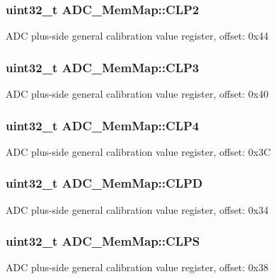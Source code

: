 \subsubsection[{C\+L\+P2}]{\setlength{\rightskip}{0pt plus 5cm}uint32\+\_\+t A\+D\+C\+\_\+\+Mem\+Map\+::\+C\+L\+P2}\label{struct_a_d_c___mem_map_aac028a79faac6929bebb1b677b2fbf8b}
A\+D\+C plus-\/side general calibration value register, offset\+: 0x44 \hypertarget{struct_a_d_c___mem_map_a6c77f6b67fa1eccf3549bcf27933f5e7}{}
\subsubsection[{C\+L\+P3}]{\setlength{\rightskip}{0pt plus 5cm}uint32\+\_\+t A\+D\+C\+\_\+\+Mem\+Map\+::\+C\+L\+P3}\label{struct_a_d_c___mem_map_a6c77f6b67fa1eccf3549bcf27933f5e7}
A\+D\+C plus-\/side general calibration value register, offset\+: 0x40 \hypertarget{struct_a_d_c___mem_map_ac5abb63ee92fd5bef99367385b258b20}{}
\subsubsection[{C\+L\+P4}]{\setlength{\rightskip}{0pt plus 5cm}uint32\+\_\+t A\+D\+C\+\_\+\+Mem\+Map\+::\+C\+L\+P4}\label{struct_a_d_c___mem_map_ac5abb63ee92fd5bef99367385b258b20}
A\+D\+C plus-\/side general calibration value register, offset\+: 0x3\+C \hypertarget{struct_a_d_c___mem_map_a33d6e852c48cf68ba5b7db5f96e284f8}{}
\subsubsection[{C\+L\+P\+D}]{\setlength{\rightskip}{0pt plus 5cm}uint32\+\_\+t A\+D\+C\+\_\+\+Mem\+Map\+::\+C\+L\+P\+D}\label{struct_a_d_c___mem_map_a33d6e852c48cf68ba5b7db5f96e284f8}
A\+D\+C plus-\/side general calibration value register, offset\+: 0x34 \hypertarget{struct_a_d_c___mem_map_a6c8a55400c2b32d7018d37b23a6f3ec1}{}
\subsubsection[{C\+L\+P\+S}]{\setlength{\rightskip}{0pt plus 5cm}uint32\+\_\+t A\+D\+C\+\_\+\+Mem\+Map\+::\+C\+L\+P\+S}\label{struct_a_d_c___mem_map_a6c8a55400c2b32d7018d37b23a6f3ec1}
A\+D\+C plus-\/side general calibration value register, offset\+: 0x38 \hypertarget{struct_a_d_c___mem_map_af687bec25a698b31731350c05cd5ba05}{}
